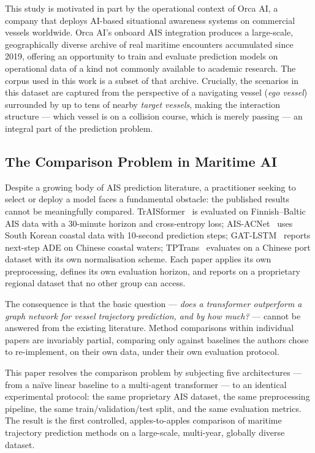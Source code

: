 \documentclass[12pt, a4paper]{article}
\begin{document}
  This study is motivated in part by the operational context of Orca AI, a company that
  deploys AI-based situational awareness systems on commercial vessels worldwide.
  Orca AI's onboard AIS integration produces a large-scale, geographically diverse
  archive of real maritime encounters accumulated since 2019, offering an opportunity
  to train and evaluate prediction models on operational data of a kind not commonly
  available to academic research.  The corpus used in this work is a subset of that
  archive.
  Crucially, the scenarios in this dataset are captured from the perspective of a navigating
  vessel (\textit{ego vessel}) surrounded by up to tens of nearby \textit{target vessels},
  making the interaction structure — which vessel is on a collision course, which is merely
  passing — an integral part of the prediction problem.

  \subsection{The Comparison Problem in Maritime AI}

  Despite a growing body of AIS prediction literature, a practitioner seeking to select
  or deploy a model faces a fundamental obstacle: the published results cannot be
  meaningfully compared.  TrAISformer~\citep{nguyen2021traisformer} is evaluated on
  Finnish–Baltic AIS data with a 30-minute horizon and cross-entropy loss;
  AIS-ACNet~\citep{shin2024aisacnet} uses South Korean coastal data with 10-second
  prediction steps; GAT-LSTM~\citep{zhao2023gatlstm} reports next-step ADE on
  Chinese coastal waters; TPTrans~\citep{wang2024tptrans} evaluates on a Chinese
  port dataset with its own normalisation scheme.  Each paper applies its own
  preprocessing, defines its own evaluation horizon, and reports on a proprietary
  regional dataset that no other group can access.

  The consequence is that the basic question — \textit{does a transformer outperform a
  graph network for vessel trajectory prediction, and by how much?} — cannot be answered
  from the existing literature.  Method comparisons within individual papers are invariably
  partial, comparing only against baselines the authors chose to re-implement, on their
  own data, under their own evaluation protocol.

  This paper resolves the comparison problem by subjecting five architectures — from a
  na\"{i}ve linear baseline to a multi-agent transformer — to an identical experimental
  protocol: the same proprietary AIS dataset, the same preprocessing pipeline, the same
  train/validation/test split, and the same evaluation metrics.  The result is the first
  controlled, apples-to-apples comparison of maritime trajectory prediction methods on
  a large-scale, multi-year, globally diverse dataset.
\end{document}
